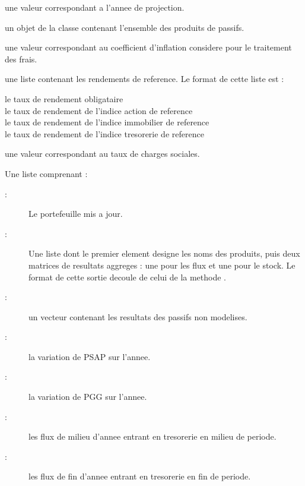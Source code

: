 \documentclass[a4paper]{book}
\begin{document}
%
\begin{Arguments}
\begin{ldescription}
\item[\code{an}] une valeur  correspondant a l'annee de projection.

\item[\code{x}] un objet de la classe  contenant l'ensemble des produits de passifs.

\item[\code{coef\_inf}] une valeur  correspondant au coefficient d'inflation
considere pour le traitement des frais.

\item[\code{list\_rd}] une liste contenant les rendements de reference. Le format de cette liste est :
\begin{description}

\item[le taux de rendement obligataire] 
\item[le taux de rendement de l'indice action de reference] 
\item[le taux de rendement de l'indice immobilier de reference] 
\item[le taux de rendement de l'indice tresorerie de reference] 

\end{description}


\item[\code{tx\_soc}] une valeur  correspondant au taux de charges sociales.
\end{ldescription}
\end{Arguments}
%
\begin{Value}
Une liste comprenant  :
\begin{description}

\item[ : ] Le portefeuille  mis a jour.
\item[ : ] Une liste dont le premier element designe les noms des produits,
puis deux matrices de resultats aggreges : une pour les flux et une pour le stock. Le format de cette sortie
decoule de celui de la methode .
\item[ : ] un vecteur contenant les resultats des passifs non modelises.
\item[ : ] la variation de PSAP sur l'annee.
\item[ : ] la variation de PGG sur l'annee.
\item[ : ] les flux de milieu d'annee entrant en tresorerie en milieu de periode.
\item[ : ] les flux de fin d'annee entrant en tresorerie en fin de periode.

\end{description}

\end{Value}
\end{document}
